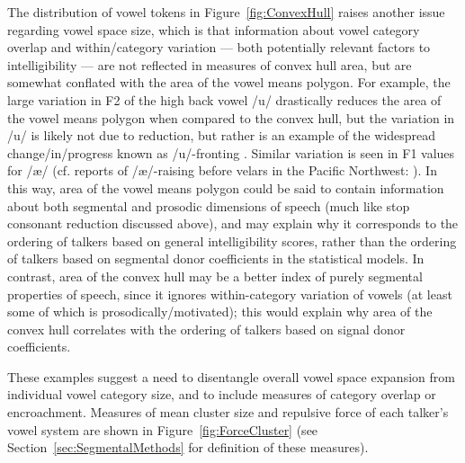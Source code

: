 The distribution of vowel tokens in Figure~\ref{fig:ConvexHull} raises another issue regarding vowel space size, which is that information about vowel category overlap and within\-/category variation — both potentially relevant factors to intelligibility — are not reflected in measures of convex hull area, but are somewhat conflated with the area of the vowel means polygon.  For example, the large variation in F2 of the high back vowel /u/ drastically reduces the area of the vowel means polygon when compared to the convex hull, but the variation in /u/ is likely not due to reduction, but rather is an example of the widespread change\-/in\-/progress known as /u/-fronting \citep[chap.\ 12]{LabovEtAl2006}.  Similar variation is seen in F1 values for /æ/ (cf. reports of /æ/-raising before velars in the Pacific Northwest: \citealt{Reed1952, WassinkEtAl2009}).  In this way, area of the vowel means polygon could be said to contain information about both segmental and prosodic dimensions of speech (much like stop consonant reduction discussed above), and may explain why it corresponds to the ordering of talkers based on general intelligibility scores, rather than the ordering of talkers based on segmental donor coefficients in the statistical models.  In contrast, area of the convex hull may be a better index of purely segmental properties of speech, since it ignores within-category variation of vowels (at least some of which is prosodically\-/motivated); this would explain why area of the convex hull correlates with the ordering of talkers based on signal donor coefficients.

These examples suggest a need to disentangle overall vowel space expansion from individual vowel category size, and to include measures of category overlap or encroachment.  Measures of mean cluster size and repulsive force of each talker’s vowel system are shown in Figure~\ref{fig:ForceCluster} (see Section~\ref{sec:SegmentalMethods} for definition of these measures).

